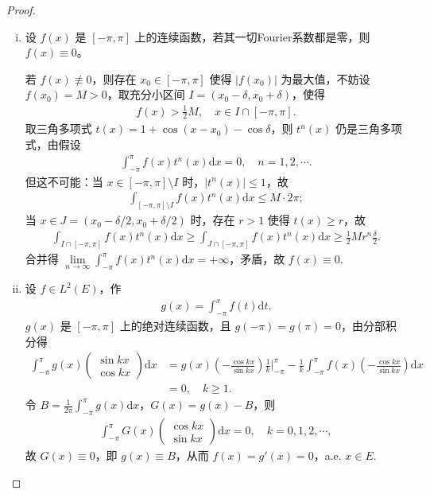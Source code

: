 \documentclass[../../main.tex]{subfiles}%
\begin{document}
\begin{proof}
\begin{enumerate}[(i)]
\item 设 $f(x)$ 是 $[-\pi, \pi]$ 上的连续函数，若其一切Fourier系数都是零，则 $f(x) \equiv 0$。

若 $f(x) \not\equiv 0$，则存在 $x_0 \in [-\pi, \pi]$ 使得 $|f(x_0)|$ 为最大值，不妨设 $f(x_0) = M > 0$，取充分小区间 $I = (x_0 - \delta, x_0 + \delta)$，使得
\begin{align*}
f(x) > \frac{1}{2}M, \quad x \in I \cap [-\pi, \pi].
\end{align*}
取三角多项式 $t(x) = 1 + \cos(x - x_0) - \cos\delta$，则 $t^n(x)$ 仍是三角多项式，由假设
\begin{align*}
\int_{-\pi}^\pi f(x) t^n(x) \mathrm{d}x = 0, \quad n=1,2,\cdots.
\end{align*}
但这不可能：当 $x \in [-\pi, \pi] \setminus I$ 时，$|t^n(x)| \leqslant 1$，故
\begin{align*}
\int_{[-\pi, \pi] \setminus I} f(x) t^n(x) \mathrm{d}x \leqslant M \cdot 2\pi;
\end{align*}
当 $x \in J = (x_0 - \delta/2, x_0 + \delta/2)$ 时，存在 $r > 1$ 使得 $t(x) \geqslant r$，故
\begin{align*}
\int_{I \cap [-\pi, \pi]} f(x) t^n(x) \mathrm{d}x \geqslant \int_{J \cap [-\pi, \pi]} f(x) t^n(x) \mathrm{d}x \geqslant \frac{1}{2}M r^n \frac{\delta}{2}.
\end{align*}
合并得 $\lim\limits_{n \to \infty} \int_{-\pi}^\pi f(x) t^n(x) \mathrm{d}x = +\infty$，矛盾，故 $f(x) \equiv 0$.

\item 设 $f \in L^2(E)$，作
\begin{align*}
g(x) = \int_{-\pi}^x f(t) \mathrm{d}t.
\end{align*}
$g(x)$ 是 $[-\pi, \pi]$ 上的绝对连续函数，且 $g(-\pi) = g(\pi) = 0$，由分部积分得
\begin{align*}
\int_{-\pi}^\pi g(x) \begin{pmatrix} \sin kx \\ \cos kx \end{pmatrix} \mathrm{d}x &= g(x) \left( -\frac{\cos kx}{\sin kx} \right) \frac{1}{k} \bigg|_{-\pi}^\pi - \frac{1}{k} \int_{-\pi}^\pi f(x) \left( -\frac{\cos kx}{\sin kx} \right) \mathrm{d}x \\
&= 0, \quad k \geqslant 1.
\end{align*}
令 $B = \frac{1}{2\pi} \int_{-\pi}^\pi g(x) \mathrm{d}x$，$G(x) = g(x) - B$，则
\begin{align*}
\int_{-\pi}^\pi G(x) \begin{pmatrix} \cos kx \\ \sin kx \end{pmatrix} \mathrm{d}x = 0, \quad k=0,1,2,\cdots,
\end{align*}
故 $G(x) \equiv 0$，即 $g(x) \equiv B$，从而 $f(x) = g'(x) = 0$，a.e. $x \in E$.
\end{enumerate}
\end{proof}
\end{document}
